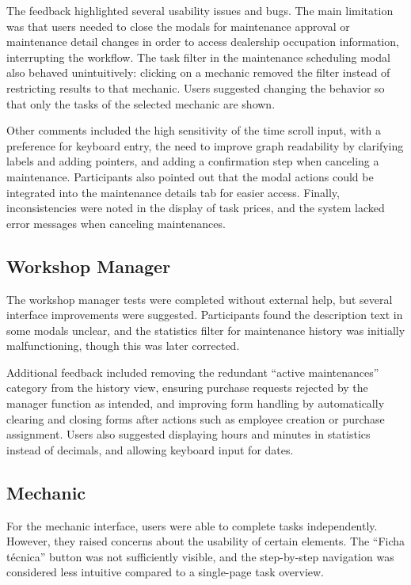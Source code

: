 The feedback highlighted several usability issues and bugs. The main limitation was that users needed to close the modals for maintenance approval or maintenance detail changes in order to access dealership occupation information, interrupting the workflow. The task filter in the maintenance scheduling modal also behaved unintuitively: clicking on a mechanic removed the filter instead of restricting results to that mechanic. Users suggested changing the behavior so that only the tasks of the selected mechanic are shown.

Other comments included the high sensitivity of the time scroll input, with a preference for keyboard entry, the need to improve graph readability by clarifying labels and adding pointers, and adding a confirmation step when canceling a maintenance. Participants also pointed out that the modal actions could be integrated into the maintenance details tab for easier access. Finally, inconsistencies were noted in the display of task prices, and the system lacked error messages when canceling maintenances.

\subsection{Workshop Manager}

The workshop manager tests were completed without external help, but several interface improvements were suggested. Participants found the description text in some modals unclear, and the statistics filter for maintenance history was initially malfunctioning, though this was later corrected.

Additional feedback included removing the redundant “active maintenances” category from the history view, ensuring purchase requests rejected by the manager function as intended, and improving form handling by automatically clearing and closing forms after actions such as employee creation or purchase assignment. Users also suggested displaying hours and minutes in statistics instead of decimals, and allowing keyboard input for dates.

\subsection{Mechanic}

For the mechanic interface, users were able to complete tasks independently. However, they raised concerns about the usability of certain elements. The “Ficha técnica” button was not sufficiently visible, and the step-by-step navigation was considered less intuitive compared to a single-page task overview.

